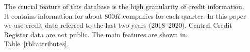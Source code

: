 The crucial feature of this database is the high granularity of credit information.
It contains information for about $800K$ companies for each quarter. In this paper we use credit data referred to the last two years (2018--2020).
Central Credit Register data are not public.
The main features are shown in.
Table~\ref{tbl:attributes}.
%
%



